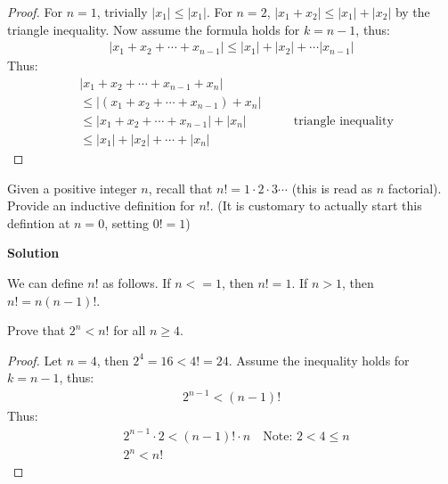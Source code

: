 \documentclass[8pt]{article}
\begin{document}
\begin{proof}
    For $n = 1$, trivially $|x_1| \le |x_1|$.
    For $n = 2$, $|x_1 + x_2| \le |x_1| + |x_2|$ by the triangle inequality.
    Now assume the formula holds for $k = n - 1$, thus:
    \begin{align*}
        |x_1 + x_2 + \cdots + x_{n - 1}| \le |x_1| + |x_2| + \cdots |x_{n - 1}|
    \end{align*}
    Thus:
    \begin{align*}
         & |x_1 + x_2 + \cdots + x_{n - 1} + x_n|        &  &                                  \\
         & \le  |(x_1 + x_2 + \cdots + x_{n - 1}) + x_n| &  &                                  \\
         & \le  |x_1 + x_2 + \cdots + x_{n - 1}| + |x_n| &  & \quad \text{triangle inequality} \\
         & \le  |x_1| + |x_2| + \cdots + |x_n|           &  & 
    \end{align*}
\end{proof}

\begin{tcolorbox}[title=Problem 4, breakable]
    Given a positive integer $n$, recall that $n! = 1 \cdot 2 \cdot 3 \cdots$ (this is read as 
    $n$ factorial). Provide an inductive definition for $n!$. (It  is customary to actually 
    start this defintion at $n = 0$, setting $0! = 1$) 
\end{tcolorbox}

\textbf{Solution}

We can define $n!$ as follows. If $n <=1$, then $n! = 1$. If $n > 1$, then $n!
    = n(n - 1)!$.

\begin{tcolorbox}[title=Problem 5, breakable]
    Prove that $2^n < n!$ for all $n \ge 4$.
\end{tcolorbox}

\begin{proof}
    Let $n = 4$, then $2^4 = 16 < 4! = 24$.
    Assume the inequality holds for $k = n - 1$, thus:
    \begin{align*}
        2^{n - 1} < (n - 1)!
    \end{align*}
    Thus:
    \begin{align*}
         & 2^{n - 1} \cdot 2 < (n - 1)! \cdot n \quad \text{Note: $2 < 4 \le n$} \\
         & 2^n < n! 
    \end{align*}
\end{proof}
\end{document}

